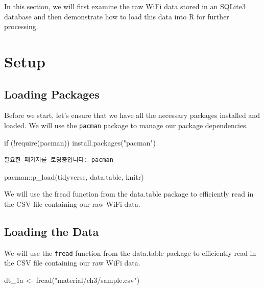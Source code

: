 \documentclass[
  letterpaper,
]{scrbook}
\newenvironment{Shaded}{\begin{snugshade}}{\end{snugshade}}
\newcommand{\ControlFlowTok}[1]{\textcolor[rgb]{0.00,0.23,0.31}{#1}}
\newcommand{\FunctionTok}[1]{\textcolor[rgb]{0.28,0.35,0.67}{#1}}
\newcommand{\NormalTok}[1]{\textcolor[rgb]{0.00,0.23,0.31}{#1}}
\newcommand{\OtherTok}[1]{\textcolor[rgb]{0.00,0.23,0.31}{#1}}
\newcommand{\SpecialCharTok}[1]{\textcolor[rgb]{0.37,0.37,0.37}{#1}}
\newcommand{\StringTok}[1]{\textcolor[rgb]{0.13,0.47,0.30}{#1}}
\begin{document}
In this section, we will first examine the raw WiFi data stored in an
SQLite3 database and then demonstrate how to load this data into R for
further processing.

\hypertarget{setup}{%
\section{Setup}\label{setup}}

\hypertarget{loading-packages}{%
\subsection{Loading Packages}\label{loading-packages}}

Before we start, let's ensure that we have all the necessary packages
installed and loaded. We will use the \texttt{pacman} package to manage
our package dependencies.

\begin{Shaded}
\begin{Highlighting}[]
\ControlFlowTok{if}\NormalTok{ (}\SpecialCharTok{!}\FunctionTok{require}\NormalTok{(pacman)) }\FunctionTok{install.packages}\NormalTok{(}\StringTok{"pacman"}\NormalTok{)}
\end{Highlighting}
\end{Shaded}

\begin{verbatim}
필요한 패키지를 로딩중입니다: pacman
\end{verbatim}

\begin{Shaded}
\begin{Highlighting}[]
\NormalTok{pacman}\SpecialCharTok{::}\FunctionTok{p\_load}\NormalTok{(tidyverse, data.table, knitr)}
\end{Highlighting}
\end{Shaded}

We will use the fread function from the data.table package to
efficiently read in the CSV file containing our raw WiFi data.

\hypertarget{loading-the-data}{%
\subsection{Loading the Data}\label{loading-the-data}}

We will use the \texttt{fread} function from the data.table package to
efficiently read in the CSV file containing our raw WiFi data.

\begin{Shaded}
\begin{Highlighting}[]
\NormalTok{dt\_1a }\OtherTok{\textless{}{-}} \FunctionTok{fread}\NormalTok{(}\StringTok{"material/ch3/sample.csv"}\NormalTok{)}
\end{Highlighting}
\end{Shaded}
\end{document}
